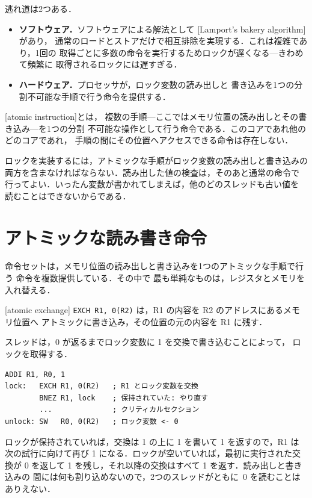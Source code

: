 \documentclass[../main.tex]{subfiles}
\begin{document}
逃れ道は2つある．
\begin{itemize}
  \item \textbf{ソフトウェア．}ソフトウェアによる解法として
    [Lamport's bakery algorithm]\cite{lamport1974} があり，
    通常のロードとストアだけで相互排除を実現する．これは複雑であり，1回の
    取得ごとに多数の命令を実行するためロックが遅くなる---きわめて頻繁に
    取得されるロックには遅すぎる．
  \item \textbf{ハードウェア．}プロセッサが，ロック変数の読み出しと
    書き込みを1つの分割不可能な手順で行う命令を提供する．
\end{itemize}

\begin{definition}[アトミック命令]
  [atomic instruction]とは，
  複数の手順---ここではメモリ位置の読み出しとその書き込み---を1つの分割
  不可能な操作として行う命令である．このコアであれ他のどのコアであれ，
  手順の間にその位置へアクセスできる命令は存在しない．
\end{definition}

ロックを実装するには，アトミックな手順がロック変数の読み出しと書き込みの
両方を含まなければならない．読み出した値の検査は，そのあと通常の命令で
行ってよい．いったん変数が書かれてしまえば，他のどのスレッドも古い値を
読むことはできないからである．

\section{アトミックな読み書き命令}
\label{sec:l20-atomic}

命令セットは，メモリ位置の読み出しと書き込みを1つのアトミックな手順で行う
命令を複数提供している．その中で
最も単純なものは，レジスタとメモリを入れ替える．

\begin{definition}[アトミック交換]
  [atomic exchange]
  \texttt{EXCH R1, 0(R2)} は，R1 の内容を R2 のアドレスにあるメモリ位置へ
  アトミックに書き込み，その位置の元の内容を R1 に残す．
\end{definition}

スレッドは，0 が返るまでロック変数に 1 を交換で書き込むことによって，
ロックを取得する．
\begin{lstlisting}[language={[x86masm]Assembler}, numbers=none, deletekeywords={lock}]
        ADDI R1, R0, 1
lock:   EXCH R1, 0(R2)   ; R1 とロック変数を交換
        BNEZ R1, lock    ; 保持されていた: やり直す
        ...              ; クリティカルセクション
unlock: SW   R0, 0(R2)   ; ロック変数 <- 0
\end{lstlisting}
ロックが保持されていれば，交換は 1 の上に 1 を書いて 1 を返すので，R1 は
次の試行に向けて再び 1 になる．ロックが空いていれば，最初に実行された交換が
0 を返して 1 を残し，それ以降の交換はすべて 1 を返す．読み出しと書き込みの
間には何も割り込めないので，2つのスレッドがともに~0 を読むことはありえない．
\end{document}
